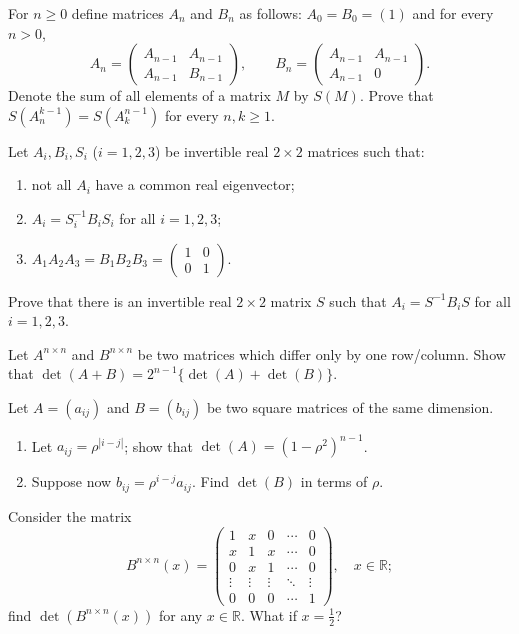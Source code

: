 \documentclass[12pt]{article}
\begin{document}
\begin{problem}
For $n\ge 0$ define matrices $A_n$ and $B_n$ as follows: $A_0=B_0=(1)$ and for every $n>0$,
\[
A_n = \begin{pmatrix} A_{n-1} & A_{n-1}\\ A_{n-1} & B_{n-1}\end{pmatrix}, \qquad B_n = \begin{pmatrix} A_{n-1} & A_{n-1}\\ A_{n-1} & 0\end{pmatrix}.
\]
Denote the sum of all elements of a matrix $M$ by $S(M)$. Prove that $S(A_n^{k-1}) = S(A_k^{n-1})$ for every $n,k\ge 1$.
\end{problem}

\begin{problem}
Let $A_i,B_i,S_i$ ($i=1,2,3$) be invertible real $2\times 2$ matrices such that:
\begin{enumerate}[label=(\arabic*)]
\item not all $A_i$ have a common real eigenvector;
\item $A_i = S_i^{-1}B_iS_i$ for all $i=1,2,3$;
\item $A_1A_2A_3 = B_1B_2B_3 = \begin{pmatrix}1 & 0\\ 0 & 1\end{pmatrix}$.
\end{enumerate}
Prove that there is an invertible real $2\times 2$ matrix $S$ such that $A_i=S^{-1}B_iS$ for all $i=1,2,3$.
\end{problem}

\begin{problem}
Let $A^{n\times n}$ and $B^{n\times n}$ be two matrices which differ only by one row/column. Show that $\det(A+B) = 2^{n-1}\{\det(A)+\det(B)\}$.
\end{problem}

\begin{problem}
Let $A=(a_{ij})$ and $B=(b_{ij})$ be two square matrices of the same dimension.
\begin{enumerate}[label=(\alph*)]
\item Let $a_{ij}=\rho^{|i-j|}$; show that $\det(A) = (1-\rho^2)^{n-1}$.
\item Suppose now $b_{ij}=\rho^{i-j}a_{ij}$. Find $\det(B)$ in terms of $\rho$.
\end{enumerate}
\end{problem}

\begin{problem}
Consider the matrix
\[
B^{n\times n}(x) = \begin{pmatrix}
1 & x & 0 & \cdots & 0\\
x & 1 & x & \cdots & 0\\
0 & x & 1 & \cdots & 0\\
\vdots & \vdots & \vdots & \ddots & \vdots\\
0 & 0 & 0 & \cdots & 1
\end{pmatrix}, \quad x\in\mathbb{R};
\]
find $\det(B^{n\times n}(x))$ for any $x\in\mathbb{R}$. What if $x=\tfrac12$?
\end{problem}
\end{document}
